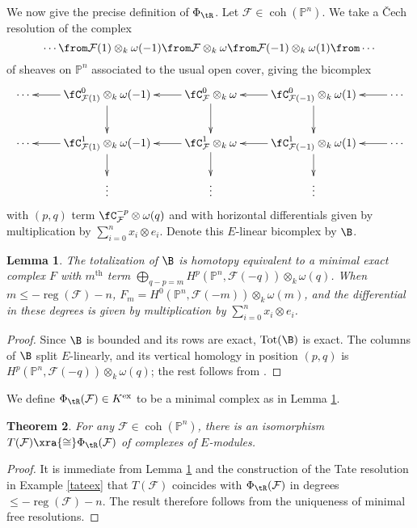\documentclass[12pt]{amsart}
\newtheorem{lemma}{Lemma}[section]
\newtheorem{thm}[lemma]{Theorem}
\theoremstyle{definition}
\theoremstyle{remark}
\newcommand{\PP}{\mathbb P}
\newcommand{\F}{\FF}
\def\on{\operatorname}
\def\om{\omega}
\def\th{\on{th}}
\def\F{\mathcal{F}}
\def\om{\omega}
\begin{document}
We now give the precise definition of $\Phi_{\tR}$. Let $\F \in \on{coh}(\PP^n)$. We take a \v{C}ech resolution of the complex
$$
\cdots \from \F(1) \otimes_k \om(-1) \from \F \otimes_k \om \from \F(-1) \otimes_k \om(1) \from \cdots
$$
of sheaves on $\PP^n$ associated to the usual open cover, giving the bicomplex
$$
\xymatrix{
\cdots & \fC^0_{\F(1)} \otimes_k \om(-1) \ar[l]\ar[d]  & \fC^0_{\F} \otimes_k \om \ar[l] \ar[d] & \fC^0_{\F(-1)} \otimes_k \om(1) \ar[l] \ar[d] & \ar[l]  \cdots\\
\cdots  & \fC^1_{\F(1)} \otimes_k \om(-1) \ar[l] \ar[d] & \fC^1_{\F} \otimes_k \om \ar[l] \ar[d]  & \fC^1_{\F(-1)} \otimes_k \om(1) \ar[l] \ar[d] & \ar[l] \cdots \\
& \vdots & \vdots  & \vdots &\\
}
$$
with $(p, q)$ term $\fC^{-p}_\F \otimes \om(q)$ and with horizontal differentials given by multiplication by $\sum_{i = 0}^n x_i \otimes e_i$. Denote this $E$-linear bicomplex by $\B$. 

\begin{lemma}
\label{splitting}
The totalization of $\B$ is homotopy equivalent to a minimal exact complex $F$ with $m^{\th}$ term $\bigoplus_{q - p = m} H^p(\PP^n,\F(-q)) \otimes_k \om(q)$. When $m \le -\on{reg}(\F) - n$, $F_m = H^0(\PP^n,\F(-m)) \otimes_k \om(m)$, and the differential in these degrees is given by multiplication by $\sum_{i = 0}^n x_i \otimes e_i$.
\end{lemma}

\begin{proof}
Since $\B$ is bounded and its rows are exact, $\on{Tot}(\B)$ is exact. The columns of $\B$ split $E$-linearly, and its vertical homology in position $(p, q)$ is $H^p(\PP^n,\F(-q)) \otimes_k \om(q)$; the rest follows from \cite[Lemma 3.5]{EFS}.
\end{proof}

We define $\Phi_{\tR}(\F) \in K^{\on{ex}}$ to be a minimal complex as in Lemma \ref{splitting}. 

\begin{thm}
\label{comparison1}
For any $\F \in \on{coh}(\PP^n)$, there is an isomorphism $T(\F) \xra{\cong} \Phi_{\tR}(\F)$ of complexes of $E$-modules.
\end{thm}

\begin{proof}
It is immediate from Lemma \ref{splitting} and the construction of the Tate resolution in Example \ref{tateex} that $T(\F)$ coincides with $\Phi_{\tR}(\F)$ in degrees $\le -\on{reg}(\F) - n$. The result therefore follows from the uniqueness of minimal free resolutions. 
\end{proof}
\end{document}
